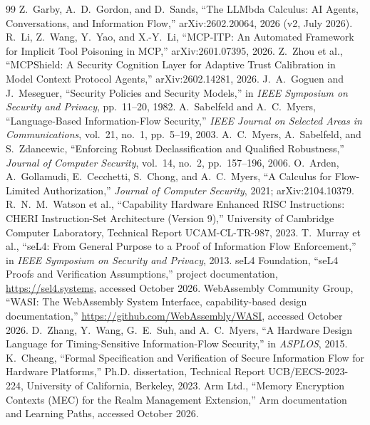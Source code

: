 \documentclass[11pt,letterpaper]{article}
\theoremstyle{plain}
\theoremstyle{definition}
\begin{document}
\small
\begin{thebibliography}{99}\setlength{\itemsep}{1pt}
 Z.~Garby, A.~D.~Gordon, and D.~Sands, ``The LLMbda Calculus: AI Agents, Conversations, and Information Flow,'' arXiv:2602.20064, 2026 (v2, July 2026).
 R.~Li, Z.~Wang, Y.~Yao, and X.-Y.~Li, ``MCP-ITP: An Automated Framework for Implicit Tool Poisoning in MCP,'' arXiv:2601.07395, 2026.
 Z.~Zhou et al., ``MCPShield: A Security Cognition Layer for Adaptive Trust Calibration in Model Context Protocol Agents,'' arXiv:2602.14281, 2026.
 J.~A.~Goguen and J.~Meseguer, ``Security Policies and Security Models,'' in \emph{IEEE Symposium on Security and Privacy}, pp.~11--20, 1982.
 A.~Sabelfeld and A.~C.~Myers, ``Language-Based Information-Flow Security,'' \emph{IEEE Journal on Selected Areas in Communications}, vol.~21, no.~1, pp.~5--19, 2003.
 A.~C.~Myers, A.~Sabelfeld, and S.~Zdancewic, ``Enforcing Robust Declassification and Qualified Robustness,'' \emph{Journal of Computer Security}, vol.~14, no.~2, pp.~157--196, 2006.
 O.~Arden, A.~Gollamudi, E.~Cecchetti, S.~Chong, and A.~C.~Myers, ``A Calculus for Flow-Limited Authorization,'' \emph{Journal of Computer Security}, 2021; arXiv:2104.10379.
 R.~N.~M.~Watson et al., ``Capability Hardware Enhanced RISC Instructions: CHERI Instruction-Set Architecture (Version 9),'' University of Cambridge Computer Laboratory, Technical Report UCAM-CL-TR-987, 2023.
 T.~Murray et al., ``seL4: From General Purpose to a Proof of Information Flow Enforcement,'' in \emph{IEEE Symposium on Security and Privacy}, 2013.
 seL4 Foundation, ``seL4 Proofs and Verification Assumptions,'' project documentation, \url{https://sel4.systems}, accessed October 2026.
 WebAssembly Community Group, ``WASI: The WebAssembly System Interface, capability-based design documentation,'' \url{https://github.com/WebAssembly/WASI}, accessed October 2026.
 D.~Zhang, Y.~Wang, G.~E.~Suh, and A.~C.~Myers, ``A Hardware Design Language for Timing-Sensitive Information-Flow Security,'' in \emph{ASPLOS}, 2015.
 K.~Cheang, ``Formal Specification and Verification of Secure Information Flow for Hardware Platforms,'' Ph.D. dissertation, Technical Report UCB/EECS-2023-224, University of California, Berkeley, 2023.
 Arm Ltd., ``Memory Encryption Contexts (MEC) for the Realm Management Extension,'' Arm documentation and Learning Paths, accessed October 2026.

\end{thebibliography}
\end{document}
